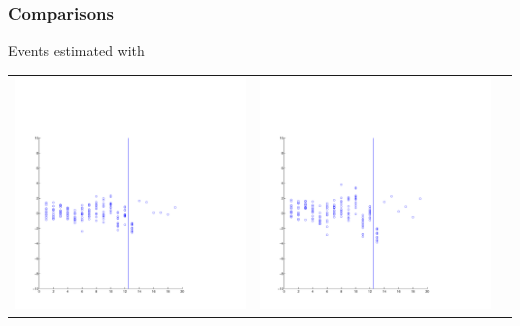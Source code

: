 \documentclass{beamer}
\begin{document}
\begin{frame}
\frametitle{Comparisons}
Events estimated with
\begin{tabular}{ccc}
\includegraphics[scale=0.15]{ex2_data1c_spm.pdf} & 
\includegraphics[scale=0.15]{ex2_data1c.pdf} & 

\end{tabular}
\end{frame}
\end{document}
